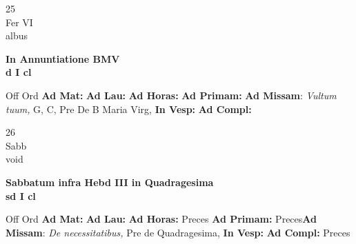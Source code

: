 \documentclass[10pt, openany]{book}
\begin{document}
    \begin{center}
        \begin{minipage}{3.5in}
            \vspace{2em}
            \begin{minipage}{0.5in}
                {\Huge 25} \\
                {\normalsize Fer VI} \\
                {\normalsize albus}
            \end{minipage}
            \begin{minipage}{3.0in}
                \textbf{ \large In Annuntiatione BMV \\
                \textnormal{\normalsize d I cl}} \\ 
            \end{minipage}
            \begin{justify}Off Ord
                \textbf{Ad Mat: }
                \textbf{Ad Lau: }
                \textbf{Ad Horas: }
                \textbf{Ad Primam: }\textbf{Ad Missam}: \textit{Vultum tuum,} G, C, Pre De B Maria Virg,  
                \textbf{In Vesp: }
                \textbf{Ad Compl: }
            \end{justify}
        \end{minipage}
    \end{center}

    \begin{center}
        \begin{minipage}{3.5in}
            \vspace{2em}
            \begin{minipage}{0.5in}
                {\Huge 26} \\
                {\normalsize Sabb} \\
                {\normalsize void}
            \end{minipage}
            \begin{minipage}{3.0in}
                \textbf{ \large Sabbatum infra Hebd III in Quadragesima \\
                \textnormal{\normalsize sd I cl}} \\ 
            \end{minipage}
            \begin{justify}Off Ord
                \textbf{Ad Mat: }
                \textbf{Ad Lau: }
                \textbf{Ad Horas: }Preces
                \textbf{Ad Primam: }Preces\textbf{Ad Missam}: \textit{De necessitatibus,} Pre de Quadragesima,  
                \textbf{In Vesp: }
                \textbf{Ad Compl: }Preces
            \end{justify}
        \end{minipage}
    \end{center}
\end{document}
